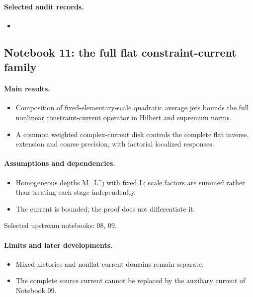 \paragraph{Selected audit records.}
\begingroup\small
\begin{itemize}
\item {}
\end{itemize}
\endgroup

\subsection{Notebook 11: the full flat constraint-current family}
\label{hnc-11}
\noindent{}\par

\paragraph{Main results.}
\begin{itemize}
\item Composition of fixed-elementary-scale quadratic average jets bounds the full nonlinear constraint-current operator in Hilbert and supremum norms.
\item A common weighted complex-current disk controls the complete flat inverse, extension and coarse precision, with factorial localized responses.
\end{itemize}

\paragraph{Assumptions and dependencies.}
\begin{itemize}
\item Homogeneous depths M=L\textasciicircum{}j with fixed L; scale factors are summed rather than treating each stage independently.
\item The current is bounded; the proof does not differentiate it.
\end{itemize}

Selected upstream notebooks: 08, 09.\par

\paragraph{Limits and later developments.}
\begin{itemize}
\item Mixed histories and nonflat current domains remain separate.
\item The complete source current cannot be replaced by the auxiliary current of Notebook 09.
\end{itemize}

